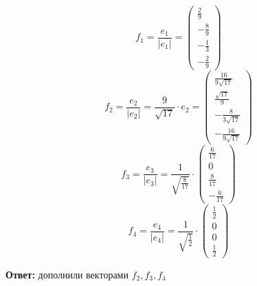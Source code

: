 \documentclass[a4paper,12pt]{article}
\begin{document}
{\Large \[
f_1 = \frac{e_1}{|e_1|} = \begin{pmatrix}
\frac{2}{9} \\ -\frac{8}{9} \\ -\frac{1}{3} \\ -\frac{2}{9}
\end{pmatrix}
\]
\[
f_2 = \frac{e_2}{|e_2|} = \frac{9}{\sqrt{17}} \cdot e_2 = \begin{pmatrix}
\frac{16}{9 \sqrt{17}} \\ \frac{\sqrt{17}}{9} \\ - \frac{8}{3\sqrt{17}} \\ -\frac{16}{9 \sqrt{17}}
\end{pmatrix}
\]
\[
f_3 = \frac{e_3}{|e_3|} = \frac{1}{\sqrt{\frac{8}{17}}} \cdot 
\begin{pmatrix}
\frac{6}{17} \\ 0 \\ \frac{8}{17} \\ -\frac{6}{17}
\end{pmatrix}
\]
\[
f_4 = \frac{e_4}{|e_4|} = \frac{1}{\sqrt{\frac{1}{2}}} \cdot \begin{pmatrix}
\frac{1}{2} \\ 0 \\ 0 \\ \frac{1}{2}
\end{pmatrix} 
\]}
\begin{center}
\textbf{Ответ: } дополнили векторами $f_2, f_3, f_4$
\end{center}
\clearpage
\end{document}
